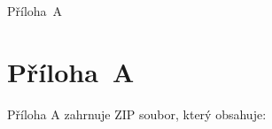 \documentclass[a4paper, 12pt]{article}
\begin{document}
\noindent Příloha~A \dotfill \pageref{1}


\clearpage {}\label{prilohaA} 
\section*{Příloha~A}

Příloha A zahrnuje ZIP soubor, který obsahuje: 

\end{document}
